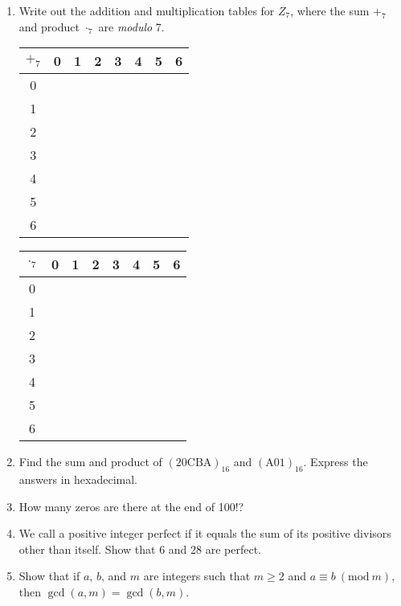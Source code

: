 \documentclass[letterpaper, 12pt]{article}
\newcommand{\PMod}[1]{\ (\mathrm{mod}\ #1)}
\begin{document}
\begin{enumerate}
    \item Write out the addition and multiplication tables for $Z_7$, where the sum $+_7$ and product $\cdot_7$ are \textit{modulo} 7.
\begin{multicols}{2}
    \begin{table}[H]
        \begin{tabular}{c|c c c c c c c}
             $+_7$ & 0 & 1 & 2 & 3 & 4 & 5 & 6\\
             \hline
             0 & & & & & & & \\
             1 & & & & & & & \\
             2 & & & & & & & \\
             3 & & & & & & & \\
             4 & & & & & & & \\
             5 & & & & & & & \\
             6 & & & & & & & 
        \end{tabular}
    \end{table}
    
    \begin{table}[H]
        \begin{tabular}{c|c c c c c c c}
             $\cdot_7$ & 0 & 1 & 2 & 3 & 4 & 5 & 6\\
             \hline
             0 & & & & & & & \\
             1 & & & & & & & \\
             2 & & & & & & & \\
             3 & & & & & & & \\
             4 & & & & & & & \\
             5 & & & & & & & \\
             6 & & & & & & &
        \end{tabular}
    \end{table}
\end{multicols}
    \item Find the sum and product of $(20\mathrm{CBA})_{16}$ and $(\mathrm{A}01)_{16}$. Express the answers in hexadecimal.
    \item How many zeros are there at the end of 100!?
    \item We call a positive integer perfect if it equals the sum of its positive divisors other than itself. Show that 6 and 28 are perfect.
    \item Show that if $a$, $b$, and $m$ are integers such that $m \geq 2$ and $a \equiv b \PMod{m}$, then $\gcd(a,m) = \gcd(b,m)$.
\end{enumerate}
\end{document}
